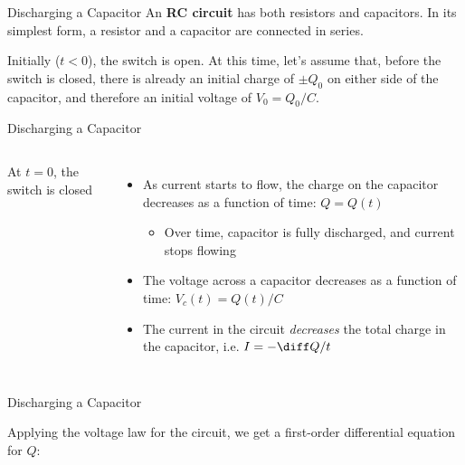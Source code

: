 \documentclass[12pt,aspectratio=169]{beamer}
\begin{document}
\begin{frame}{Discharging a Capacitor}
  An \textbf{RC circuit} has both resistors and capacitors. In its simplest
  form, a resistor and a capacitor are connected in series.
  \begin{center}
  \end{center}
  Initially ($t<0$), the switch is open. At this time, let's assume that,
  before the switch is closed, there is already an initial charge of $\pm Q_0$
  on either side of the capacitor, and therefore an initial voltage of
  $V_0=Q_0/C$.
\end{frame}



\begin{frame}{Discharging a Capacitor}
  \begin{columns}
    \centering
    At $t=0$, the switch is closed
    \begin{itemize}
    \item As current starts to flow, the charge on the capacitor decreases
      as a function of time: $Q=Q(t)$
      \begin{itemize}
      \item Over time, capacitor is fully discharged, and current stops flowing
      \end{itemize}
    \item The voltage across a capacitor decreases as a function of time:
      $V_c(t)=Q(t)/C$
    \item The current in the circuit \emph{decreases} the total charge in
      the capacitor, i.e. $I=-\diff Q/t$
    \end{itemize}
  \end{columns}
\end{frame}



\begin{frame}{Discharging a Capacitor}
  \begin{center}
  \end{center}
  Applying the voltage law for the circuit, we get a first-order differential
  equation for $Q$:
  
\end{frame}
\end{document}
